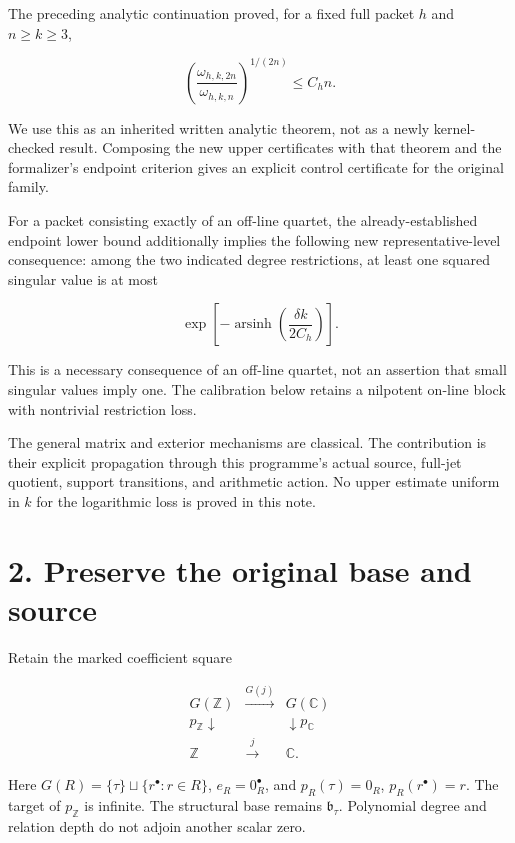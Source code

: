\documentclass[
  11pt,
]{article}
\begin{document}
The preceding analytic continuation proved, for a fixed full packet
\(h\) and \(n\ge k\ge3\),

\[
 \left(\frac{\omega_{h,k,2n}}{\omega_{h,k,n}}\right)^{1/(2n)}
 \le C_h n.                                                     \tag{5}
\]

We use this as an inherited written analytic theorem, not as a newly
kernel-checked result. Composing the new upper certificates with that
theorem and the formalizer's endpoint criterion gives an explicit
control certificate for the original family.

For a packet consisting exactly of an off-line quartet, the
already-established endpoint lower bound additionally implies the
following new representative-level consequence: among the two indicated
degree restrictions, at least one squared singular value is at most

\[
 \boxed{\exp\!\left[-\operatorname{arsinh}
                \left(\frac{\delta k}{2C_h}\right)\right].}       \tag{6}
\]

This is a necessary consequence of an off-line quartet, not an assertion
that small singular values imply one. The calibration below retains a
nilpotent on-line block with nontrivial restriction loss.

The general matrix and exterior mechanisms are classical. The
contribution is their explicit propagation through this programme's
actual source, full-jet quotient, support transitions, and arithmetic
action. No upper estimate uniform in \(k\) for the logarithmic loss is
proved in this note.

\section{2. Preserve the original base and
source}\label{preserve-the-original-base-and-source}

Retain the marked coefficient square

\[
\begin{array}{ccc}
G(\mathbb Z)&\xrightarrow{G(j)}&G(\mathbb C)\\
p_{\mathbb Z}\downarrow&&\downarrow p_{\mathbb C}\\
\mathbb Z&\xrightarrow{j}&\mathbb C.
\end{array}                                                       \tag{7}
\]

Here \(G(R)=\{\tau\}\sqcup\{r^\bullet:r\in R\}\), \(e_R=0_R^\bullet\),
and \(p_R(\tau)=0_R\), \(p_R(r^\bullet)=r\). The target of
\(p_{\mathbb Z}\) is infinite. The structural base remains
\(\mathfrak b_\tau\). Polynomial degree and relation depth do not adjoin
another scalar zero.
\end{document}
